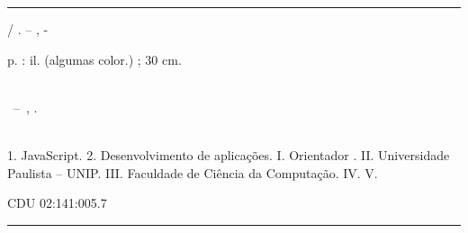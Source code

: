 \documentclass[
	12pt,				%
	openright,			%
	twoside,			%
	a4paper,			%
	english,			%
	brazil				%
	]{abntex2}
\begin{document}
\frenchspacing 


\imprimircapa

\imprimirfolhaderosto*


%
%     
\begin{fichacatalografica}
	\vspace*{\fill}					%
	\hrule							%
	\begin{center}					%
	\begin{minipage}[c]{12.5cm}		%
	
	\imprimirautor
	
	\hspace{0.5cm} \imprimirtitulo  / \imprimirautor. --
	\imprimirlocal, \imprimirdata-
	
	\hspace{0.5cm} \pageref{LastPage} p. : il. (algumas color.) ; 30 cm.\\
	
	\hspace{0.5cm} \imprimirorientadorRotulo~\imprimirorientador\\
	
	\hspace{0.5cm}
	\parbox[t]{\textwidth}{\imprimirtipotrabalho~--~\imprimirinstituicao,
	\imprimirdata.}\\
	
	\hspace{0.5cm}
		1. JavaScript.
		2. Desenvolvimento de aplicações.
		I. Orientador \imprimirorientador.
		II. Universidade Paulista -- UNIP.
		III. Faculdade de Ciência da Computação.
		IV. \imprimirtitulo 
		V. \imprimirautor
	
	\hspace{8.75cm} CDU 02:141:005.7\\
	
	\end{minipage}
	\end{center}
	\hrule
\end{fichacatalografica}
\end{document}
